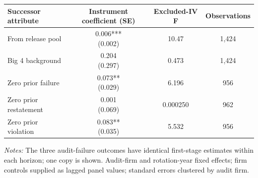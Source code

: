\documentclass[10pt]{article}
\begin{document}
\begin{minipage}{19cm}\fontsize{10}{12}\selectfont\setlength{\tabcolsep}{4pt}\renewcommand{\arraystretch}{1.12}


\centering
{}
\begin{threeparttable}
\begin{tabular}{p{}ccc}
\toprule
Successor attribute & Instrument coefficient (SE) & Excluded-IV F & Observations \\
\midrule
From release pool & \shortstack{0.006***\\(0.002)} & 10.47 & 1,424 \\
Big 4 background & \shortstack{0.204\\(0.297)} & 0.473 & 1,424 \\
Zero prior failure & \shortstack{0.073**\\(0.029)} & 6.196 & 956 \\
Zero prior restatement & \shortstack{0.001\\(0.069)} & 0.000250 & 962 \\
Zero prior violation & \shortstack{0.083**\\(0.035)} & 5.532 & 956 \\
\bottomrule
\end{tabular}
\begin{tablenotes}\fontsize{9}{11}\selectfont
\item \raggedright \fontsize{9}{11}\selectfont \textit{Notes:} The three audit-failure outcomes have identical first-stage estimates within each horizon; one copy is shown. Audit-firm and rotation-year fixed effects; firm controls supplied as lagged panel values; standard errors clustered by audit firm.
\end{tablenotes}
\end{threeparttable}

\end{minipage}
\end{document}
